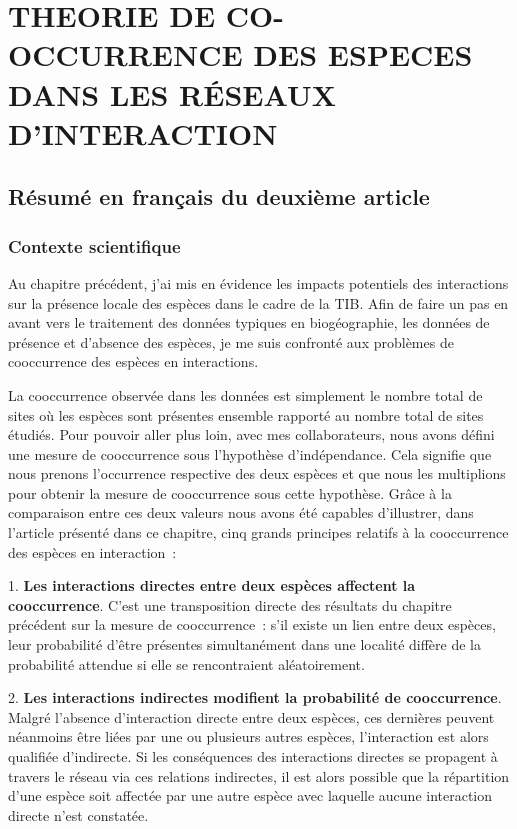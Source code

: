 \chapter{THEORIE DE CO-OCCURRENCE DES ESPECES DANS LES RÉSEAUX D'INTERACTION}
\label{chap2}

\section{Résumé en français du deuxième article}


\subsection{Contexte scientifique}

Au chapitre précédent, j'ai mis en évidence les impacts potentiels des
interactions sur la présence locale des espèces dans le cadre de la TIB.
Afin de faire un pas en avant vers le traitement des données typiques en
biogéographie, les données de présence et d'absence des espèces, je me suis
confronté aux problèmes de cooccurrence des espèces en interactions.

La cooccurrence observée dans les données est simplement le nombre total de
sites où les espèces sont présentes ensemble rapporté au nombre total de sites
étudiés. Pour pouvoir aller plus loin, avec mes collaborateurs, nous avons
défini une mesure de cooccurrence sous l'hypothèse d'indépendance.
Cela signifie que nous prenons l'occurrence respective des deux espèces
et que nous les multiplions pour obtenir la mesure de cooccurrence sous
cette hypothèse. Grâce à la comparaison entre ces deux valeurs nous avons été
capables d'illustrer, dans l'article présenté dans ce chapitre, cinq grands
principes relatifs à la cooccurrence des espèces en interaction~:

1. \textbf{Les interactions directes entre deux espèces affectent la cooccurrence}.
C'est une transposition directe des résultats du chapitre précédent
sur la mesure de cooccurrence~: s'il existe un lien entre deux espèces,
leur probabilité d'être présentes simultanément dans une localité diffère de la
probabilité attendue si elle se rencontraient aléatoirement.

2. \textbf{Les interactions indirectes modifient la probabilité de cooccurrence}.
Malgré l'absence d'interaction directe entre deux espèces, ces dernières peuvent
néanmoins être liées par une ou plusieurs autres espèces, l'interaction est
alors qualifiée d'indirecte. Si les conséquences des interactions directes se
propagent à travers le réseau via ces relations indirectes, il est alors
possible que la répartition d'une espèce soit affectée par une autre espèce avec
laquelle aucune interaction directe n'est constatée.

